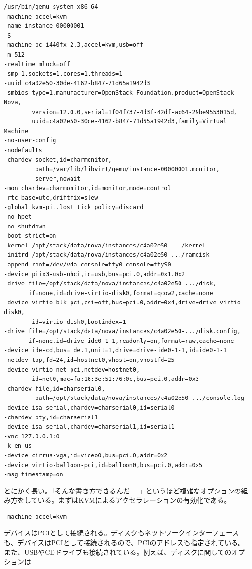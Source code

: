 ﻿\documentclass[9pt,b5paper,tombo,openany]{jsbook}
\begin{document}
\begin{lstlisting}
/usr/bin/qemu-system-x86_64
-machine accel=kvm
-name instance-00000001
-S
-machine pc-i440fx-2.3,accel=kvm,usb=off
-m 512
-realtime mlock=off
-smp 1,sockets=1,cores=1,threads=1
-uuid c4a02e50-30de-4162-b847-71d65a1942d3
-smbios type=1,manufacturer=OpenStack Foundation,product=OpenStack Nova,
        version=12.0.0,serial=1f04f737-4d3f-42df-ac64-29be9553015d,
        uuid=c4a02e50-30de-4162-b847-71d65a1942d3,family=Virtual Machine
-no-user-config
-nodefaults
-chardev socket,id=charmonitor,
         path=/var/lib/libvirt/qemu/instance-00000001.monitor,
         server,nowait
-mon chardev=charmonitor,id=monitor,mode=control
-rtc base=utc,driftfix=slew
-global kvm-pit.lost_tick_policy=discard
-no-hpet
-no-shutdown
-boot strict=on
-kernel /opt/stack/data/nova/instances/c4a02e50-.../kernel
-initrd /opt/stack/data/nova/instances/c4a02e50-.../ramdisk
-append root=/dev/vda console=tty0 console=ttyS0
-device piix3-usb-uhci,id=usb,bus=pci.0,addr=0x1.0x2
-drive file=/opt/stack/data/nova/instances/c4a02e50-.../disk,
       if=none,id=drive-virtio-disk0,format=qcow2,cache=none
-device virtio-blk-pci,csi=off,bus=pci.0,addr=0x4,drive=drive-virtio-disk0,
        id=virtio-disk0,bootindex=1
-drive file=/opt/stack/data/nova/instances/c4a02e50-.../disk.config,
       if=none,id=drive-ide0-1-1,readonly=on,format=raw,cache=none
-device ide-cd,bus=ide.1,unit=1,drive=drive-ide0-1-1,id=ide0-1-1
-netdev tap,fd=24,id=hostnet0,vhost=on,vhostfd=25
-device virtio-net-pci,netdev=hostnet0,
        id=net0,mac=fa:16:3e:51:76:0c,bus=pci.0,addr=0x3
-chardev file,id=charserial0,
         path=/opt/stack/data/nova/instances/c4a02e50-.../console.log
-device isa-serial,chardev=charserial0,id=serial0
-chardev pty,id=charserial1
-device isa-serial,chardev=charserial1,id=serial1
-vnc 127.0.0.1:0
-k en-us
-device cirrus-vga,id=video0,bus=pci.0,addr=0x2
-device virtio-balloon-pci,id=balloon0,bus=pci.0,addr=0x5
-msg timestamp=on
\end{lstlisting}

とにかく長い。「そんな書き方できるんだ……」というほど複雑なオプションの組み方をしている。まずはKVMによるアクセラレーションの有効化である。

\begin{lstlisting}
-machine accel=kvm
\end{lstlisting}

デバイスはPCIとして接続される。ディスクもネットワークインターフェースも、デバイスはPCIとして接続されるので、PCIのアドレスも指定されている。また、USBやCDドライブも接続されている。例えば、ディスクに関してのオプションは
\end{document}
